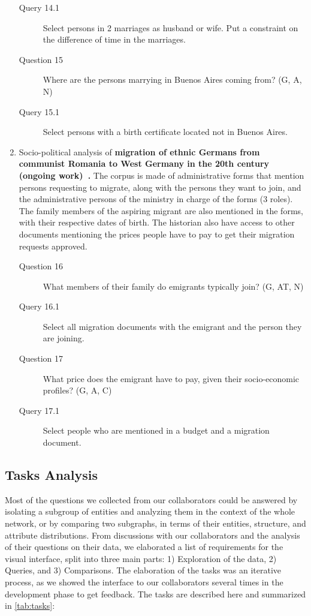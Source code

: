 \begin{enumerate}
\begin{footnotesize}
\begin{description}
    \item[\myindent Query 14.1] Select persons in 2 marriages as husband or wife. Put a constraint on the difference of time in the marriages.
    \item[Question 15] Where are the persons marrying in Buenos Aires coming from? (G, A, N)
    \item[\myindent Query 15.1] Select persons with a birth certificate located not in Buenos Aires.
    \end{description}
    \end{footnotesize}

    \item Socio-political analysis of \textbf{migration of ethnic Germans from communist Romania to West Germany in the 20th century (ongoing work)~\cite{diminescuMigrationEthnicGermans2020}.}
    The corpus is made of administrative forms that mention persons requesting to migrate, along with the persons they want to join, and the administrative persons of the ministry in charge of the forms (3 roles).
    The family members of the aspiring migrant are also mentioned in the forms, with their respective dates of birth.
    The historian also have access to other documents mentioning the prices people have to pay to get their migration requests approved.
     \begin{footnotesize}
    \begin{description}
    \item[Question 16] What members of their family do emigrants typically join? (G, AT, N)
    \item[\myindent Query 16.1] Select all migration documents with the emigrant and the person they are joining.
    \item[Question 17] What price does the emigrant have to pay, given their socio-economic profiles? (G, A, C)
    \item[\myindent Query 17.1] Select people who are mentioned in a budget and a migration document.
    \end{description}
    \end{footnotesize}
\end{enumerate}


\subsection{Tasks Analysis}

Most of the questions we collected from our collaborators could be answered by isolating a subgroup of entities and analyzing them in the context of the whole network, or by comparing two subgraphs, in terms of their entities, structure, and attribute distributions.
From discussions with our collaborators and the analysis of their questions on their data, we elaborated a list of requirements for the visual interface, split into three main parts: 1) Exploration of the data, 2) Queries, and 3) Comparisons.
The elaboration of the tasks was an iterative process, as we showed the interface to our collaborators several times in the development phase to get feedback.
The tasks are described here and summarized in \autoref{tab:tasks}:

